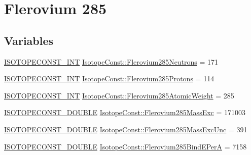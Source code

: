 \hypertarget{group___isotope_const-_flerovium-_fl285}{}\section{Flerovium 285}
\label{group___isotope_const-_flerovium-_fl285}
\subsection*{Variables}
\begin{DoxyCompactItemize}
\item 
\mbox{\hyperlink{group___isotope_const-_macros_ga5f18360b3e99483a35c32d789e62621c}{I\+S\+O\+T\+O\+P\+E\+C\+O\+N\+S\+T\+\_\+\+I\+NT}} \mbox{\hyperlink{group___isotope_const-_flerovium-_fl285_ga71df69560250236ba177b36fadae332b}{Isotope\+Const\+::\+Flerovium285\+Neutrons}} = 171
\item 
\mbox{\hyperlink{group___isotope_const-_macros_ga5f18360b3e99483a35c32d789e62621c}{I\+S\+O\+T\+O\+P\+E\+C\+O\+N\+S\+T\+\_\+\+I\+NT}} \mbox{\hyperlink{group___isotope_const-_flerovium-_fl285_ga663db8f899d7d164d4fb44665d5239a6}{Isotope\+Const\+::\+Flerovium285\+Protons}} = 114
\item 
\mbox{\hyperlink{group___isotope_const-_macros_ga5f18360b3e99483a35c32d789e62621c}{I\+S\+O\+T\+O\+P\+E\+C\+O\+N\+S\+T\+\_\+\+I\+NT}} \mbox{\hyperlink{group___isotope_const-_flerovium-_fl285_ga31467065e6055a495c31b4eb1b031e7a}{Isotope\+Const\+::\+Flerovium285\+Atomic\+Weight}} = 285
\item 
\mbox{\hyperlink{group___isotope_const-_macros_ga8f45a7272ce02c0b4c65c44636ed719a}{I\+S\+O\+T\+O\+P\+E\+C\+O\+N\+S\+T\+\_\+\+D\+O\+U\+B\+LE}} \mbox{\hyperlink{group___isotope_const-_flerovium-_fl285_gac79f5db765e9539f0f909e705a62776f}{Isotope\+Const\+::\+Flerovium285\+Mass\+Exc}} = 171003
\item 
\mbox{\hyperlink{group___isotope_const-_macros_ga8f45a7272ce02c0b4c65c44636ed719a}{I\+S\+O\+T\+O\+P\+E\+C\+O\+N\+S\+T\+\_\+\+D\+O\+U\+B\+LE}} \mbox{\hyperlink{group___isotope_const-_flerovium-_fl285_ga9d193b22a78049bef9cb75db5c99d982}{Isotope\+Const\+::\+Flerovium285\+Mass\+Exc\+Unc}} = 391
\item 
\mbox{\hyperlink{group___isotope_const-_macros_ga8f45a7272ce02c0b4c65c44636ed719a}{I\+S\+O\+T\+O\+P\+E\+C\+O\+N\+S\+T\+\_\+\+D\+O\+U\+B\+LE}} \mbox{\hyperlink{group___isotope_const-_flerovium-_fl285_gaafb95ab8f4a21d730ca503cc6e1849c1}{Isotope\+Const\+::\+Flerovium285\+Bind\+E\+PerA}} = 7158
\item 

\end{DoxyCompactItemize}
